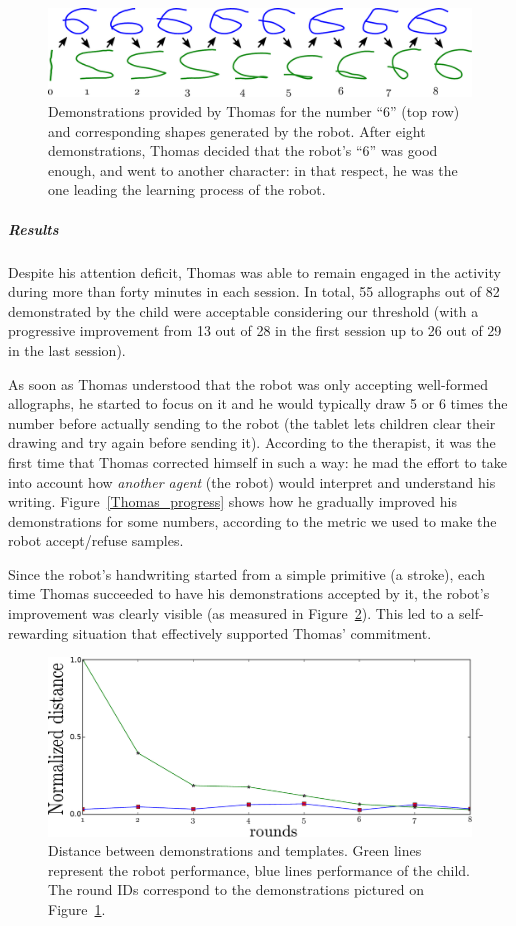 \documentclass[10pt,a4paper]{article}
\begin{document}
\begin{figure}[!]
    \centering
    \includegraphics[width=0.6\linewidth]{learning_6_demos}
    \caption{\small Demonstrations provided by Thomas for the number ``6'' (top row) and
        corresponding shapes generated by the robot. After eight demonstrations,
        Thomas decided that the robot's ``6'' was good enough, and went to
    another character: in that respect, he was the one leading the learning
process of the robot.}
    \label{learning_6_demos}
\end{figure}
\subparagraph{Results}
Despite his attention deficit, Thomas was able to remain engaged in the activity during more than
forty minutes in each session. In total, 55 allographs out of 82 
demonstrated by the child were acceptable considering our threshold (with a
progressive improvement from 13 out of 28 in the first session up to 26 out
of 29 in the last session).

As soon as Thomas understood that the robot was only accepting well-formed
allographs, he started to focus on it and he would typically draw 5 or 6 times
the number before actually sending to the robot (the tablet lets children
clear their drawing and try again before sending it). According to
the therapist, it was the first time that Thomas corrected himself in such a
way: he mad the effort to take into account how \emph{another agent} (the robot) would
interpret and understand his writing. Figure~\ref{Thomas_progress} shows how
he gradually improved his demonstrations for some numbers, according to the
metric we used to make the robot accept/refuse samples.

Since the robot's handwriting started from a simple primitive (a stroke), each
time Thomas succeeded to have his demonstrations accepted by it, the robot's
improvement was clearly visible (as measured in Figure~\ref{Thomas_distances}).
This led to a self-rewarding situation that effectively supported Thomas'
commitment.

\begin{figure}[!]
    \centering
    \includegraphics[width=0.6\linewidth]{learning_6_distances}
    \caption{\small Distance between demonstrations and templates. Green lines represent the robot performance,
blue lines performance of the child. The round IDs correspond to the demonstrations
pictured on Figure~\ref{learning_6_demos}.}
    \label{Thomas_distances}
\end{figure}
\end{document}

